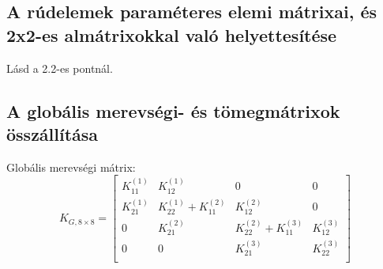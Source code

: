 \documentclass{article}
\begin{document}
			\begin{figure}[h!]		
				\begin{center}
				\end{center}	
			\caption{}
			\end{figure}
	
		\subsection{A rúdelemek paraméteres elemi mátrixai, és 2x2-es almátrixokkal való helyettesítése}
		
			Lásd a 2.2-es pontnál.
		
		\subsection{A globális merevségi- és tömegmátrixok összállítása}
		
			Globális merevségi mátrix:
			\begin{equation}
				K_{G,8\times8}=
				\begin{bmatrix}
					K_{11}^{(1)} & K_{12}^{(1)}              & 0            			    & 0            \\
					K_{21}^{(1)} & K_{22}^{(1)}+K_{11}^{(2)} & K_{12}^{(2)}  			    & 0            \\
					0            & K_{21}^{(2)}              & K_{22}^{(2)} + K_{11}^{(3)}  & K_{12}^{(3)} \\
					0            & 0						 & K_{21}^{(3)} 				& K_{22}^{(3)} \\
				\end{bmatrix}
			\end{equation}
		
\end{document}
